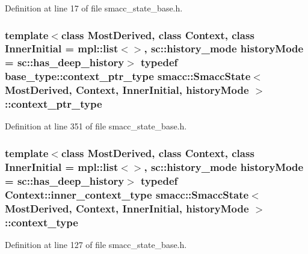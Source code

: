 Definition at line 17 of file smacc\+\_\+state\+\_\+base.\+h.

\subsubsection[{\texorpdfstring{context\+\_\+ptr\+\_\+type}{context_ptr_type}}]{\setlength{\rightskip}{0pt plus 5cm}template$<$class Most\+Derived, class Context, class Inner\+Initial = mpl\+::list$<$$>$, sc\+::history\+\_\+mode history\+Mode = sc\+::has\+\_\+deep\+\_\+history$>$ typedef base\+\_\+type\+::context\+\_\+ptr\+\_\+type {\bf smacc\+::\+Smacc\+State}$<$ Most\+Derived, Context, Inner\+Initial, history\+Mode $>$\+::{\bf context\+\_\+ptr\+\_\+type}}\hypertarget{classsmacc_1_1SmaccState_a0e15b77514301039f6bc093a9d3f6425}{}\label{classsmacc_1_1SmaccState_a0e15b77514301039f6bc093a9d3f6425}


Definition at line 351 of file smacc\+\_\+state\+\_\+base.\+h.

\subsubsection[{\texorpdfstring{context\+\_\+type}{context_type}}]{\setlength{\rightskip}{0pt plus 5cm}template$<$class Most\+Derived, class Context, class Inner\+Initial = mpl\+::list$<$$>$, sc\+::history\+\_\+mode history\+Mode = sc\+::has\+\_\+deep\+\_\+history$>$ typedef Context\+::inner\+\_\+context\+\_\+type {\bf smacc\+::\+Smacc\+State}$<$ Most\+Derived, Context, Inner\+Initial, history\+Mode $>$\+::{\bf context\+\_\+type}}\hypertarget{classsmacc_1_1SmaccState_a65c128d05dbcadbf817f41ba20b8fa01}{}\label{classsmacc_1_1SmaccState_a65c128d05dbcadbf817f41ba20b8fa01}


Definition at line 127 of file smacc\+\_\+state\+\_\+base.\+h.


